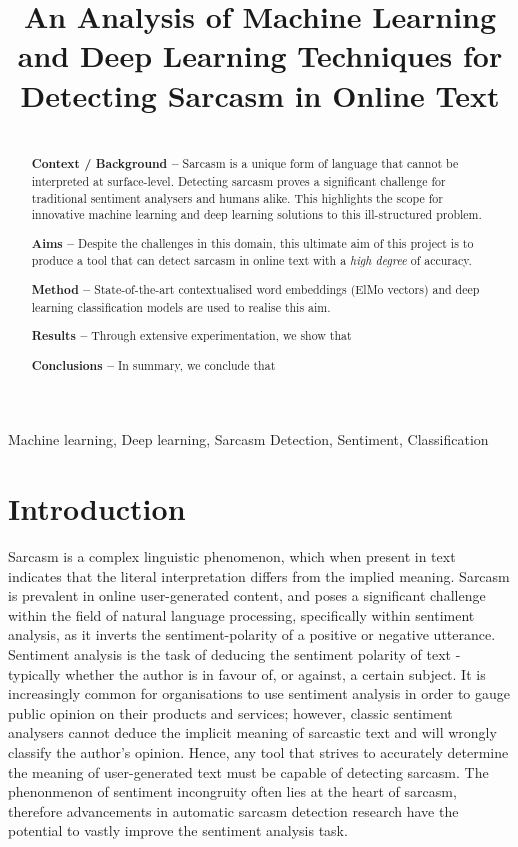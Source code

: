 \documentclass[12pt,a4paper]{article}
\title{An Analysis of Machine Learning and Deep Learning Techniques for Detecting Sarcasm in Online Text}
\author{} %
\date{}
\begin{document}
	
\maketitle

\begin{abstract}
\\ \indent \textbf{Context / Background --} 
Sarcasm is a unique form of language that cannot be interpreted at surface-level. Detecting sarcasm proves a significant challenge for traditional sentiment analysers and humans alike. This highlights the scope for innovative machine learning and deep learning solutions to this ill-structured problem.

\indent \textbf{Aims --} Despite the challenges in this domain, this ultimate aim of this project is to produce a tool that can detect sarcasm in online text with a \textit{high degree} of accuracy. 

\indent \textbf{Method --} State-of-the-art contextualised word embeddings (ElMo vectors) and deep learning classification models are used to realise this aim.

\indent \textbf{Results --} Through extensive experimentation, we show that

\indent \textbf{Conclusions --} In summary, we conclude that

\end{abstract}

\begin{keywords}
Machine learning, Deep learning, Sarcasm Detection, Sentiment, Classification
\end{keywords}


\section{Introduction}
\noindent Sarcasm is a complex linguistic phenomenon, which when present in text indicates that the literal interpretation differs from the implied meaning. Sarcasm is prevalent in online user-generated content, and poses a significant challenge within the field of natural language processing, specifically within sentiment analysis, as it inverts the sentiment-polarity of a positive or negative utterance. Sentiment analysis is the task of deducing the sentiment polarity of text - typically whether the author is in favour of, or against, a certain subject. It is increasingly common for organisations to use sentiment analysis in order to gauge public opinion on their products and services; however, classic sentiment analysers cannot deduce the implicit meaning of sarcastic text and will wrongly classify the author's opinion. Hence, any tool that strives to accurately determine the meaning of user-generated text must be capable of detecting sarcasm. The phenonmenon of sentiment incongruity often lies at the heart of sarcasm, therefore advancements in automatic sarcasm detection research have the potential to vastly improve the sentiment analysis task.
\end{document}
